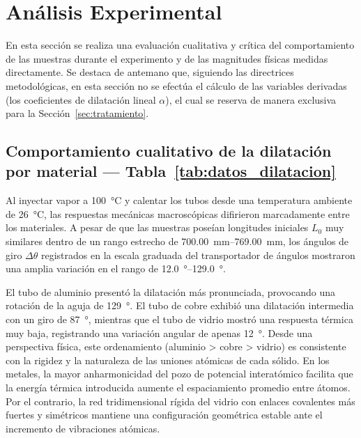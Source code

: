 
\section{Análisis Experimental}
\label{sec:analisis_exp}

En esta sección se realiza una evaluación cualitativa y crítica del comportamiento de las muestras durante el experimento y de las magnitudes físicas medidas directamente. Se destaca de antemano que, siguiendo las directrices metodológicas, en esta sección no se efectúa el cálculo de las variables derivadas (los coeficientes de dilatación lineal $\alpha$), el cual se reserva de manera exclusiva para la Sección~\ref{sec:tratamiento}.

\subsection{Comportamiento cualitativo de la dilatación por material --- Tabla~\ref{tab:datos_dilatacion}}

Al inyectar vapor a \qty{100}{\celsius} y calentar los tubos desde una temperatura ambiente de \qty{26}{\celsius}, las respuestas mecánicas macroscópicas difirieron marcadamente entre los materiales. A pesar de que las muestras poseían longitudes iniciales $L_0$ muy similares dentro de un rango estrecho de \qtyrange{700,00}{769,00}{\milli\meter}, los ángulos de giro $\Delta\theta$ registrados en la escala graduada del transportador de ángulos mostraron una amplia variación en el rango de \qtyrange{12,0}{129,0}{\degree}. 

El tubo de aluminio presentó la dilatación más pronunciada, provocando una rotación de la aguja de \qty{129}{\degree}. El tubo de cobre exhibió una dilatación intermedia con un giro de \qty{87}{\degree}, mientras que el tubo de vidrio mostró una respuesta térmica muy baja, registrando una variación angular de apenas \qty{12}{\degree}. Desde una perspectiva física, este ordenamiento (aluminio > cobre > vidrio) es consistente con la rigidez y la naturaleza de las uniones atómicas de cada sólido. En los metales, la mayor anharmonicidad del pozo de potencial interatómico facilita que la energía térmica introducida aumente el espaciamiento promedio entre átomos. Por el contrario, la red tridimensional rígida del vidrio con enlaces covalentes más fuertes y simétricos mantiene una configuración geométrica estable ante el incremento de vibraciones atómicas.

